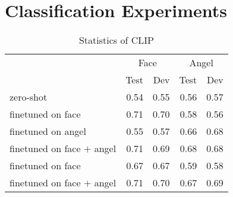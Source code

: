 
\section{Classification Experiments}
    




\begin{table}[htb!]
\begin{minipage}{1\textwidth}
\begin{center}
{\small
\begin{tabular}{lrrrr}
\toprule
& \multicolumn{2}{c}{Face} & \multicolumn{2}{c}{Angel}\\
~ & Test & Dev & Test & Dev \\
\midrule 
zero-shot & 0.54 & 0.55 & 0.56 & 0.57 \\
finetuned on face & 0.71 & 0.70 & 0.58 & 0.56 \\
finetuned on angel & 0.55 & 0.57 & 0.66 & 0.68 \\
finetuned on face $+$ angel & 0.71 & 0.69 & 0.68 & 0.68\\
\midrule
finetuned on face & 0.67 & 0.67 & 0.59 & 0.58 \\
finetuned on face $+$ angel & 0.71 & 0.70 & 0.67 & 0.69 \\
\bottomrule
\end{tabular}}
\caption{Statistics of CLIP}
\label{clip_results_table.single_acc}
\end{center}
\end{minipage} 
\end{table}

